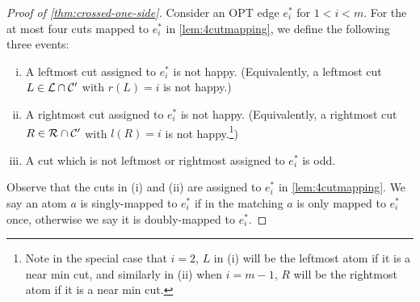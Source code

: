 
\begin{proof}[Proof of \cref{thm:crossed-one-side}]
Consider an OPT edge $e^*_i$ for $1<i<m$.
For the at most four cuts mapped to $e^*_i$ in \cref{lem:4cutmapping}, we define the following three events:
\begin{enumerate}[i)]
\item A leftmost cut assigned to $e^*_i$ is not happy. (Equivalently, a leftmost cut $L \in {\cal L} \cap {\cal C}'$ with $r(L)=i$ is not happy.)
\item A rightmost cut assigned to $e^*_i$ is not happy. (Equivalently, a rightmost cut $R \in {\mathcal{R}} \cap {\cal C}'$ with $l(R)=i$ is not happy.\footnote{Note in the special case that $i=2$, $L$ in (i) will be the leftmost atom if it is a near min cut, and similarly in (ii) when $i=m-1$, $R$ will be the rightmost atom if it is a near min cut.})
\item A cut which is not leftmost or rightmost assigned to $e^*_i$ is odd.
\end{enumerate}
Observe that the cuts in (i) and (ii) are assigned to $e^*_i$ in \cref{lem:4cutmapping}. We say an atom $a$ is singly-mapped to $e^*_i$ if in the matching $a$ is only mapped to $e^*_i$ once, otherwise we say it is doubly-mapped to $e^*_i$. 


\end{proof}
